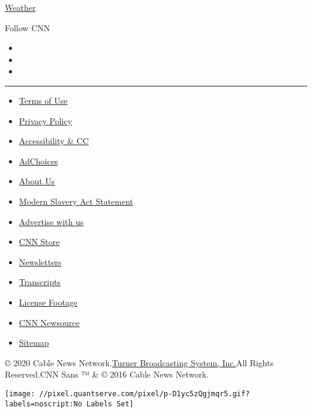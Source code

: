 \href{/weather}{Weather}

Follow CNN

\begin{itemize}
\item
\item
\item
\end{itemize}

\begin{center}\rule{0.5\linewidth}{\linethickness}\end{center}

\begin{itemize}
\tightlist
\item
  \href{/terms}{Terms of Use}
\item
  \href{/privacy}{Privacy Policy}
\item
  \href{/accessibility}{Accessibility \& CC}
\item
  \protect\hyperlink{}{AdChoices}
\item
  \href{/about}{About Us}
\item
  \href{/msa}{Modern Slavery Act Statement}
\item
  \href{https://commercial.cnn.com}{Advertise with us}
\item
  \href{//store.cnn.com}{CNN Store}
\item
  \href{/newsletters}{Newsletters}
\item
  \href{/transcripts}{Transcripts}
\item
  \href{/collection}{License Footage}
\item
  \href{http://cnnnewsource.com}{CNN Newsource}
\item
  \href{https://www.cnn.com/sitemap.html}{Sitemap}
\end{itemize}

© 2020 Cable News Network.\href{//www.turner.com}{Turner Broadcasting
System, Inc.}All Rights Reserved.CNN Sans ™ \& © 2016 Cable News
Network.

\texttt{[image: //pixel.quantserve.com/pixel/p-D1yc5zQgjmqr5.gif?labels=noscript:No Labels Set]}
